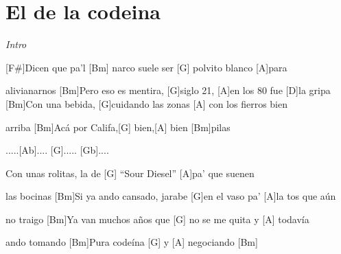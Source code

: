 \section{El de la codeina}

\noindent
\vspace{1cm}

\begin{guitar}
	\begin{multicols}{2}

		\textit{Intro}

		[F#]Dicen que pa'l [Bm] narco suele ser [G] polvito blanco [A]para \par [D] alivianarnos
		[Bm]Pero eso es mentira, [G]siglo 21, [A]en los 80 fue [D]la gripa
		[Bm]Con una bebida, [G]cuidando las zonas [A] con los fierros bien \par [D]arriba
		[Bm]Ac\'a por Califa,[G] bien,[A] bien [Bm]pilas
		\par
		[A].....[Ab].... [G]..... [Gb].... \par
		[Bm]Con unas rolitas, la de [G] ``Sour Diesel'' [A]pa' que suenen \par [D]  las bocinas
		[Bm]Si ya ando cansado, jarabe [G]en el vaso pa' [A]la tos que aún \par [D] no traigo
		[Bm]Ya van muchos a\~{n}os que [G] no se me quita y [A] todav\'ia \par [D] ando tomando
		[Bm]Pura code\'ina [G] y [A] negociando [Bm] \par


\end{multicols}
\end{guitar}
